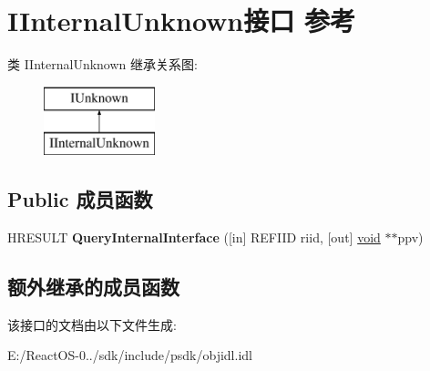 \hypertarget{interface_i_internal_unknown}{}\section{I\+Internal\+Unknown接口 参考}
\label{interface_i_internal_unknown}
类 I\+Internal\+Unknown 继承关系图\+:\begin{figure}[H]
\begin{center}
\leavevmode
\includegraphics[height=2.000000cm]{interface_i_internal_unknown}
\end{center}
\end{figure}
\subsection*{Public 成员函数}
\begin{DoxyCompactItemize}
\item 
\mbox{\label{interface_i_internal_unknown_aee3d366e18cc3d5d17a21dbe237194f7}} 
H\+R\+E\+S\+U\+LT {\bfseries Query\+Internal\+Interface} (\mbox{[}in\mbox{]} R\+E\+F\+I\+ID riid, \mbox{[}out\mbox{]} \hyperlink{interfacevoid}{void} $\ast$$\ast$ppv)
\end{DoxyCompactItemize}
\subsection*{额外继承的成员函数}


该接口的文档由以下文件生成\+:\begin{DoxyCompactItemize}
\item 
E\+:/\+React\+O\+S-\/0../sdk/include/psdk/objidl.\+idl\end{DoxyCompactItemize}
